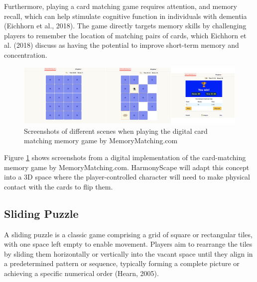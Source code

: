 \documentclass{l4proj}
\begin{document}
Furthermore, playing a card matching game requires attention, and memory recall, which can help stimulate cognitive function in individuals with dementia (Eichhorn et al., 2018). The game directly targets memory skills by challenging players to remember the location of matching pairs of cards, which Eichhorn et al. (2018) discuss as having the potential to improve short-term memory and concentration.

\begin{figure}[h]
    \centering
    \includegraphics[width=1.0\linewidth]{dissertation/images/mem_matching.jpg}    

    \caption{Screenshots of different scenes when playing the digital card matching memory game by MemoryMatching.com
    }

    \label{fig:mem_match} 
\end{figure}

Figure \ref{fig:mem_match} shows screenshots from a digital implementation of the card-matching memory game by MemoryMatching.com. HarmonyScape will adapt this concept into a 3D space where the player-controlled character will need to make physical contact with the cards to flip them. 

\subsection{Sliding Puzzle}
A sliding puzzle is a classic game comprising a grid of square or rectangular tiles, with one space left empty to enable movement. Players aim to rearrange the tiles by sliding them horizontally or vertically into the vacant space until they align in a predetermined pattern or sequence, typically forming a complete picture or achieving a specific numerical order (Hearn, 2005).
\end{document}
